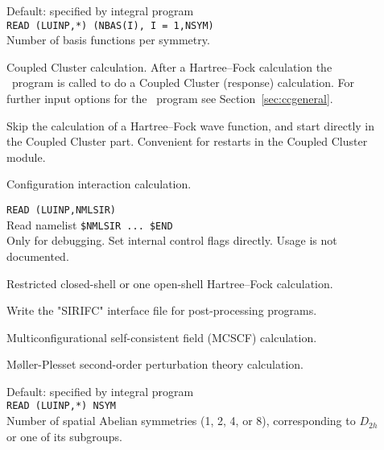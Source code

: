 \begin{description}
\item[]
   Default: specified by integral program \\
   \verb"READ (LUINP,*) (NBAS(I), I = 1,NSYM)" \\
   Number of basis functions per symmetry.

\item[]
  Coupled Cluster calculation. After a Hartree--Fock calculation
  the \cc\ program is called to do a Coupled Cluster (response) calculation.
  For further input options for the \cc\ program see
  Section~\ref{sec:ccgeneral}. 

\item[] Skip the calculation of a Hartree--Fock wave
  function, and start directly in the Coupled Cluster part. Convenient
  for restarts in the Coupled Cluster module.

\item[]
  Configuration interaction calculation.

\item[]
  \verb"READ (LUINP,NMLSIR)" \\
  Read namelist \verb"$NMLSIR ... $END" \\
  Only for debugging. Set internal control flags directly.
  Usage is not documented.

\item[]
  Restricted closed-shell or one open-shell 
  Hartree--Fock calculation.

\item[]
  Write the "SIRIFC" interface file for post-processing programs.

\item[]
  Multiconfigurational self-consistent field (MCSCF) calculation.

\item[]
  M{\o}ller-Plesset second-order perturbation theory calculation.

\item[]
  Default: specified by integral program \\
  \verb"READ (LUINP,*) NSYM" \\
  Number of spatial Abelian symmetries (1, 2, 4, or 8), corresponding
  to $D_{2h}$ or one of its subgroups.



\end{description}
